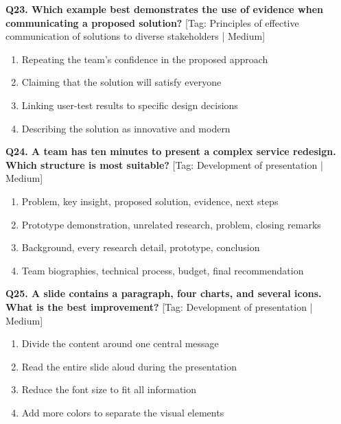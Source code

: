 \noindent\textbf{Q23. Which example best demonstrates the use of evidence when communicating a proposed solution?} \hfill [Tag: Principles of effective communication of solutions to diverse stakeholders | Medium]
\begin{enumerate}[label=(\alph*),topsep=2pt,itemsep=1pt,partopsep=0pt,parsep=0pt]
    \item {Repeating the team's confidence in the proposed approach}
    \item {Claiming that the solution will satisfy everyone}
    \item {Linking user-test results to specific design decisions}
    \item {Describing the solution as innovative and modern}
\end{enumerate}
\vspace{2mm}

\noindent\textbf{Q24. A team has ten minutes to present a complex service redesign. Which structure is most suitable?} \hfill [Tag: Development of presentation | Medium]
\begin{enumerate}[label=(\alph*),topsep=2pt,itemsep=1pt,partopsep=0pt,parsep=0pt]
    \item {Problem, key insight, proposed solution, evidence, next steps}
    \item {Prototype demonstration, unrelated research, problem, closing remarks}
    \item {Background, every research detail, prototype, conclusion}
    \item {Team biographies, technical process, budget, final recommendation}
\end{enumerate}
\vspace{2mm}

\noindent\textbf{Q25. A slide contains a paragraph, four charts, and several icons. What is the best improvement?} \hfill [Tag: Development of presentation | Medium]
\begin{enumerate}[label=(\alph*),topsep=2pt,itemsep=1pt,partopsep=0pt,parsep=0pt]
    \item {Divide the content around one central message}
    \item {Read the entire slide aloud during the presentation}
    \item {Reduce the font size to fit all information}
    \item {Add more colors to separate the visual elements}
\end{enumerate}
\vspace{2mm}

